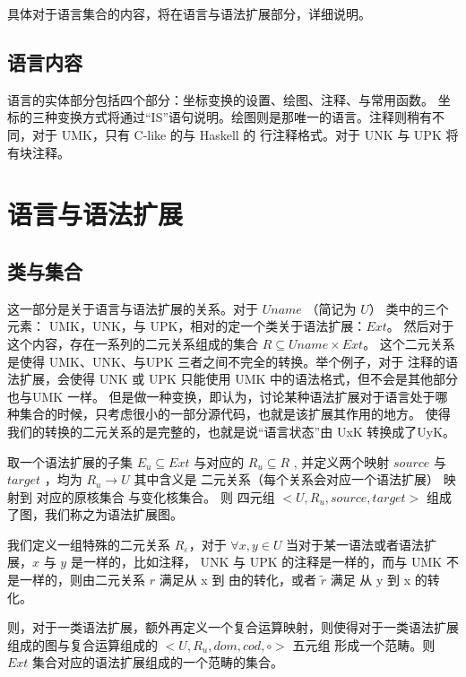 \documentclass{ctexart}
\begin{document}
具体对于语言集合的内容，将在语言与语法扩展部分，详细说明。

\subsection{语言内容}
\label{sec:intro:lang}

语言的实体部分包括四个部分：坐标变换的设置、绘图、注释、与常用函数。
坐标的三种变换方式将通过“IS”语句说明。绘图则是那唯一的语言。注释则稍有不同，对于 UMK，只有 C-like 的与 Haskell
的 行注释格式。对于 UNK 与 UPK 将有块注释。



\section{语言与语法扩展}
\label{sec:languageextension}

\subsection{类与集合}
\label{sec:langexte:classNset}

这一部分是关于语言与语法扩展的关系。对于 $Uname$ （简记为 $U$） 类中的三个元素： UMK，UNK，与 UPK，相对的定一个类关于语法扩展：$Ext$。
然后对于这个内容，存在一系列的二元关系组成的集合 $ R \subseteq Uname \times Ext $。 这个二元关系是使得 UMK、UNK、与UPK
三者之间不完全的转换。举个例子，对于 注释的语法扩展，会使得 UNK 或 UPK 只能使用 UMK 中的语法格式，但不会是其他部分也与UMK 一样。
但是做一种变换，即认为，讨论某种语法扩展对于语言处于哪种集合的时候，只考虑很小的一部分源代码，也就是该扩展其作用的地方。
使得 我们的转换的二元关系的是完整的，也就是说“语言状态”由 UxK 转换成了UyK。

取一个语法扩展的子集 $E_u \subseteq Ext$ 与对应的 $R_u \subseteq R$ , 并定义两个映射 $source$ 与 $target$ ，均为
$ R_u \rightarrow U$ 其中含义是 二元关系（每个关系会对应一个语法扩展） 映射到 对应的原核集合 与变化核集合。
则 四元组 $<U,R_u,source,target>$ 组成了图，我们称之为语法扩展图。

我们定义一组特殊的二元关系 $R_\varepsilon$，对于 $ \forall x,y \in U$ 当对于某一语法或者语法扩展，$x$ 与 $y$ 是一样的，比如注释，
UNK 与 UPK 的注释是一样的，而与 UMK 不是一样的，则由二元关系 $r$ 满足从 x 到 由的转化，或者 $\widetilde{r}$ 满足 从 y 到 x 的转化。

则，对于一类语法扩展，额外再定义一个复合运算映射，则使得对于一类语法扩展组成的图与复合运算组成的 $<U,R_u,dom,cod,\circ>$ 五元组
形成一个范畴。则 $Ext$ 集合对应的语法扩展组成的一个范畴的集合。

\end{document}
